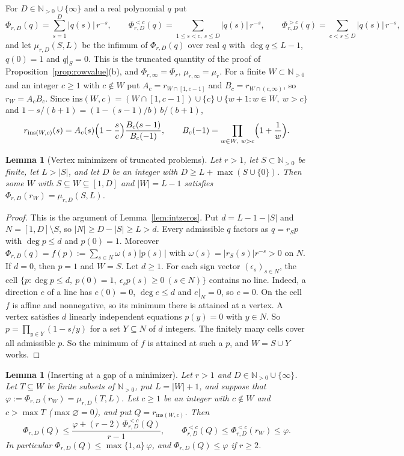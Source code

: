 \documentclass[11pt]{article}
\newtheorem{lemma}[theorem]{Lemma}
\newcommand{\N}{\mathbb N}
\begin{document}
For $D\in\N_{>0}\cup\{\infty\}$ and a real polynomial $q$ put
\[
  \Phi_{r,D}(q)=\sum_{s=1}^{D}|q(s)|\,r^{-s},\qquad
  \Phi_{r,D}^{<c}(q)=\sum_{1\le s<c,\ s\le D}|q(s)|\,r^{-s},\qquad
  \Phi_{r,D}^{>c}(q)=\sum_{c<s\le D}|q(s)|\,r^{-s},
\]
and let $\mu_{r,D}(S,L)$ be the infimum of $\Phi_{r,D}(q)$ over real $q$ with
$\deg q\le L-1$, $q(0)=1$ and $q|_S=0$.  This is the truncated quantity of the
proof of Proposition~\ref{prop:rowvalue}(b), and
$\Phi_{r,\infty}=\Phi_r$, $\mu_{r,\infty}=\mu_r$.  For a finite
$W\subset\N_{>0}$ and an integer $c\ge1$ with $c\notin W$ put
$A_c=r_{W\cap[1,c-1]}$ and $B_c=r_{W\cap(c,\infty)}$, so $r_W=A_cB_c$.  Since
$\mathrm{ins}(W,c)=(W\cap[1,c-1])\cup\{c\}\cup\{w+1:w\in W,\ w>c\}$ and
$1-s/(b+1)=(1-(s-1)/b)\,b/(b+1)$,
\[
  r_{\mathrm{ins}(W,c)}(s)=A_c(s)\Bigl(1-\frac sc\Bigr)\frac{B_c(s-1)}{B_c(-1)},
  \qquad B_c(-1)=\prod_{w\in W,\ w>c}\Bigl(1+\frac1w\Bigr).
\]

\begin{lemma}[Vertex minimizers of truncated problems]\label{lem:truncvertex}
Let $r>1$, let $S\subset\N_{>0}$ be finite, let $L>|S|$, and let $D$ be an
integer with $D\ge L+\max(S\cup\{0\})$.  Then some $W$ with
$S\subseteq W\subseteq[1,D]$ and $|W|=L-1$ satisfies
$\Phi_{r,D}(r_W)=\mu_{r,D}(S,L)$.
\end{lemma}

\begin{proof}
This is the argument of Lemma~\ref{lem:intzeros}.  Put $d=L-1-|S|$ and
$N=[1,D]\setminus S$, so $|N|\ge D-|S|\ge L>d$.  Every admissible $q$
factors as $q=r_Sp$ with $\deg p\le d$ and $p(0)=1$.  Moreover
$\Phi_{r,D}(q)=f(p):=\sum_{s\in N}\omega(s)|p(s)|$ with
$\omega(s)=|r_S(s)|r^{-s}>0$ on $N$.  If $d=0$, then $p=1$ and $W=S$.  Let
$d\ge1$.  For each sign vector $(\epsilon_s)_{s\in N}$, the cell
$\{p:\deg p\le d,\ p(0)=1,\ \epsilon_sp(s)\ge0\ (s\in N)\}$ contains no line.
Indeed, a direction $e$ of a line has $e(0)=0$, $\deg e\le d$ and $e|_N=0$,
so $e=0$.  On the cell $f$ is affine and nonnegative, so its minimum there is
attained at a vertex.  A vertex satisfies $d$ linearly independent equations
$p(y)=0$ with $y\in N$.  So $p=\prod_{y\in Y}(1-s/y)$ for a set $Y\subseteq N$
of $d$ integers.  The finitely many cells cover all admissible $p$.  So the
minimum of $f$ is attained at such a $p$, and $W=S\cup Y$ works.
\end{proof}

\begin{lemma}[Inserting at a gap of a minimizer]\label{lem:optins}
Let $r>1$ and $D\in\N_{>0}\cup\{\infty\}$.  Let $T\subseteq W$ be finite
subsets of $\N_{>0}$, put $L=|W|+1$, and suppose that
$\varphi:=\Phi_{r,D}(r_W)=\mu_{r,D}(T,L)$.  Let $c\ge1$ be an integer with
$c\notin W$ and $c>\max T$ ($\max\varnothing=0$), and put
$Q=r_{\mathrm{ins}(W,c)}$.  Then
\[
  \Phi_{r,D}(Q)\le\frac{\varphi+(r-2)\,\Phi_{r,D}^{<c}(Q)}{r-1},
  \qquad
  \Phi_{r,D}^{<c}(Q)\le\Phi_{r,D}^{<c}(r_W)\le\varphi .
\]
In particular $\Phi_{r,D}(Q)\le\max\{1,a\}\,\varphi$, and
$\Phi_{r,D}(Q)\le\varphi$ if $r\ge2$.
\end{lemma}
\end{document}
